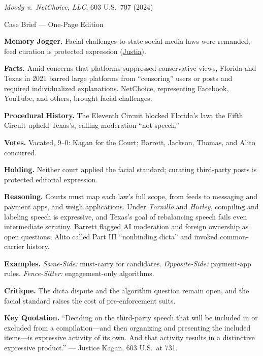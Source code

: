 \documentclass[12pt]{article}
\begin{document}
\begin{center}
{\Large \textit{Moody v.\ NetChoice, LLC}, 603 U.S.\ 707 (2024)\par}
\vspace{0.3em}
{\normalsize Case Brief --- One-Page Edition\par}
\end{center}

\textbf{Memory Jogger.} Facial challenges to state social-media laws were remanded; feed curation is protected expression (\href{https://supreme.justia.com/cases/federal/us/603/22-277/}{Justia}).

\textbf{Facts.} Amid concerns that platforms suppressed conservative views, Florida and Texas in 2021 barred large platforms from ``censoring'' users or posts and required individualized explanations. NetChoice, representing Facebook, YouTube, and others, brought facial challenges.

\textbf{Procedural History.} The Eleventh Circuit blocked Florida's law; the Fifth Circuit upheld Texas's, calling moderation ``not speech.''

\textbf{Votes.} Vacated, 9--0: Kagan for the Court; Barrett, Jackson, Thomas, and Alito concurred.

\textbf{Holding.} Neither court applied the facial standard; curating third-party posts is protected editorial expression.

\textbf{Reasoning.} Courts must map each law's full scope, from feeds to messaging and payment apps, and weigh applications. Under \textit{Tornillo} and \textit{Hurley}, compiling and labeling speech is expressive, and Texas's goal of rebalancing speech fails even intermediate scrutiny. Barrett flagged AI moderation and foreign ownership as open questions; Alito called Part III ``nonbinding dicta'' and invoked common-carrier history.

\textbf{Examples.} \emph{Same-Side:} must-carry for candidates. \emph{Opposite-Side:} payment-app rules. \emph{Fence-Sitter:} engagement-only algorithms.

\textbf{Critique.} The dicta dispute and the algorithm question remain open, and the facial standard raises the cost of pre-enforcement suits.

\textbf{Key Quotation.} ``Deciding on the third-party speech that will be included in or excluded from a compilation---and then organizing and presenting the included items---is expressive activity of its own. And that activity results in a distinctive expressive product.'' --- Justice Kagan, 603 U.S.\ at 731.
\end{document}
